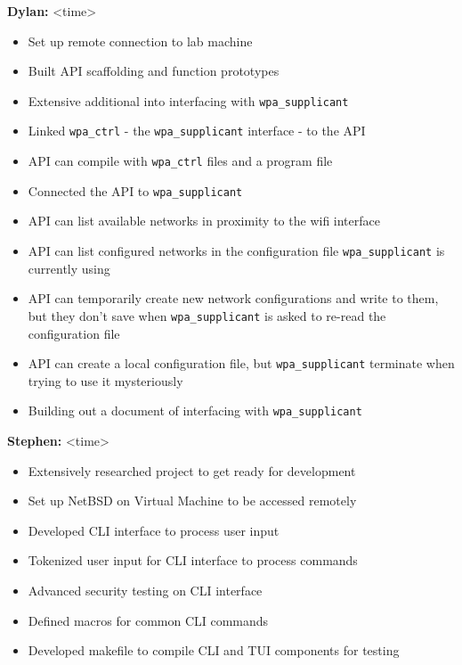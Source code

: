 \documentclass[11pt]{article}
\begin{document}
\textbf{Dylan:} <time>
\begin{itemize}
  \item Set up remote connection to lab machine
  \item Built API scaffolding and function prototypes
  \item Extensive additional into interfacing with \texttt{wpa\_supplicant}
  \item Linked \texttt{wpa\_ctrl} - the \texttt{wpa\_supplicant} interface - to the API
  \item API can compile with \texttt{wpa\_ctrl} files and a program file
  \item Connected the API to \texttt{wpa\_supplicant}
  \item API can list available networks in proximity to the wifi interface
  \item API can list configured networks in the configuration file \texttt{wpa\_supplicant} is currently using
  \item API can temporarily create new network configurations and write to them, but they don't save when 
    \texttt{wpa\_supplicant} is asked to re-read the configuration file
  \item API can create a local configuration file, but \texttt{wpa\_supplicant} terminate when trying to use it mysteriously
  \item Building out a document of interfacing with \texttt{wpa\_supplicant}
\end{itemize}

\textbf{Stephen:} <time>
\begin{itemize}
  \item Extensively researched project to get ready for development 
  \item Set up NetBSD on Virtual Machine to be accessed remotely
  \item Developed CLI interface to process user input
  \item Tokenized user input for CLI interface to process commands
  \item Advanced security testing on CLI interface 
  \item Defined macros for common CLI commands
  \item Developed makefile to compile CLI and TUI components for testing 
\end{itemize}
\end{document}
